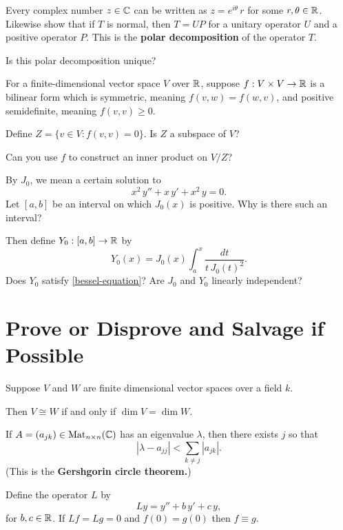 \documentclass{homework}
\begin{document}
\begin{problem}
  Every complex number $z \in \mathbb{C}$ can be written as
  $z = e^{i \theta}\, r$ for some $r, \theta \in \mathbb{R}$.  Likewise show
  that if $T$ is normal, then $T = UP$ for a unitary operator $U$ and
  a positive operator $P$.  This is the \textbf{polar decomposition}
  of the operator $T$.

  Is this polar decomposition unique?
\end{problem}

\begin{problem}
  For a finite-dimensional vector space $V$ over $\mathbb{R}$, suppose
  $f : V \times V \to \mathbb{R}$ is a bilinear form which is symmetric,
  meaning $f(v,w) = f(w,v)$, and positive semidefinite, meaning
  $f(v,v) \geq 0$.

  Define $Z = \{ v \in V : f(v,v) = 0 \}$.  Is $Z$ a subspace of $V$?
  
  Can you use $f$ to construct an inner product on $V/Z$?
\end{problem}

\begin{problem}
  By $J_0$, we mean a certain solution to
  \begin{equation}\label{bessel-equation}\tag{$**$}
    x^2 \, y'' + x \, y' + x^2 \, y = 0.
  \end{equation}
  Let $[a,b]$ be an interval on which $J_0(x)$ is positive.  Why is
  there such an interval?

  Then define $Y_0 : [a,b] \to \mathbb{R}$ by 
  \[
    Y_0(x) = J_0(x) \int_a^x \frac{dt}{t \, J_0(t)^2}.
  \]
  Does $Y_0$ satisfy \eqref{bessel-equation}?  Are $J_0$ and $Y_0$
  linearly independent?
\end{problem}

\section{Prove or Disprove and Salvage if Possible}

\begin{problem}
  Suppose $V$ and $W$ are finite dimensional vector spaces over a field $k$.

  Then $V \cong W$ if and only if $\dim V = \dim W$.
\end{problem}

\begin{problem}
  If $A = (a_{jk}) \in \operatorname{Mat}_{n\times n}(\mathbb{C})$ has an eigenvalue $\lambda$, then
  there exists $j$ so that
  \[
    \left| \lambda - a_{jj} \right| < \sum_{k \neq j} \left|a_{jk} \right|.
  \]
  (This is the \textbf{Gershgorin circle theorem.})
\end{problem}

\begin{problem}
  Define the operator $L$ by
  \[
    Ly = y'' + b \, y' + c \, y,
  \]
  for $b, c \in \mathbb{R}$.  If $Lf = Lg = 0$ and $f(0) = g(0)$ then $f \equiv g$.
\end{problem}
\end{document}
